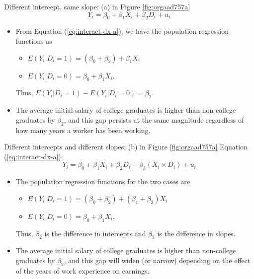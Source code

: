 \documentclass[presentation,10pt]{beamer}
\begin{document}
\begin{frame}[label={sec:orgf94e401}]{Different intercept, same slope: (a) in Figure \ref{fig:orgaad757a}}
\begin{equation}
\label{eq:interact-dx-a}
Y_i = \beta_0 + \beta_1 X_i + \beta_2 D_i + u_i
\end{equation}

\begin{itemize}
\item From Equation (\ref{eq:interact-dx-a}), we have the population
regression functions as
\begin{itemize}
\item \(E(Y_i | D_i = 1) = (\beta_0 + \beta_2) + \beta_1 X_i\)
\item \(E(Y_i | D_i = 0) = \beta_0 + \beta_1 X_i\).
\end{itemize}
Thus, \(E(Y_i | D_i = 1) - E(Y_i | D_i = 0) = \beta_2\).

\item The average initial salary of college graduates is higher than
non-college graduates by \(\beta_2\), and this gap persists at the same
magnitude regardless of how many years a worker has been working.
\end{itemize}
\end{frame}

\begin{frame}[label={sec:org1ad1870}]{Different intercepts and different slopes: (b) in Figure \ref{fig:orgaad757a}}
Equation (\ref{eq:interact-dx-a}):
\begin{equation}
\label{eq:interact-dx-b}
Y_i = \beta_0 + \beta_1 X_i + \beta_2 D_i + \beta_3 (X_i \times D_i) + u_i
\end{equation}

\begin{itemize}
\item The population regression functions for the two cases are
\begin{itemize}
\item \(E(Y_i|D_i=1) = (\beta_0+\beta_2) + (\beta_1 + \beta_3) X_i\)
\item \(E(Y_i|D_i=0) = \beta_0 + \beta_1 X_i\).
\end{itemize}
Thus, \(\beta_2\) is the difference in intercepts and \(\beta_3\) is the
difference in slopes.

\item The average initial salary of college graduates is higher than
non-college graduates by \(\beta_2\), and this gap will widen (or
narrow) depending on the effect of the years of work experience on
earnings.
\end{itemize}
\end{frame}
\end{document}
